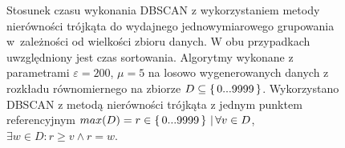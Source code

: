 \begin{figure}
	\centering
  \caption{Stosunek czasu wykonania DBSCAN z wykorzystaniem metody nierówności trójkąta do wydajnego jednowymiarowego grupowania \mbox{w zależności} od wielkości zbioru danych. W obu przypadkach uwzględniony jest czas sortowania. Algorytmy wykonane z parametrami $ \varepsilon=200 $, $ \mu=5 $ na losowo wygenerowanych danych z rozkładu równomiernego na zbiorze \mbox{$ D \subseteq \set{ 0...9999 } $}. Wykorzystano DBSCAN z metodą nierówności trójkąta z jednym punktem referencyjnym \mbox{$ max(D) = r \in \set{ 0...9999 } \,|\, \forall v \in D$, $\exists w \in D : r \ge v \land r = w$.}}\label{odc:odc-vs-dbscan-ratio}
\end{figure}